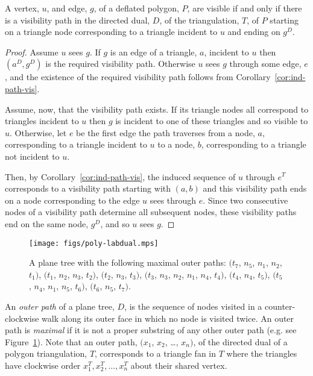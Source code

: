\documentclass[11pt]{amsart}
\begin{document}
\begin{theorem}
  \label{thm:dd-det-ve}
  A vertex, $u$, and edge, $g$, of a deflated polygon, $P$, are
  visible if and only if there is a visibility path in the directed
  dual, $D$, of the triangulation, $T$, of $P$ starting on a triangle
  node corresponding to a triangle incident to $u$ and ending on
  $g^D$.
\end{theorem}
\begin{proof}
  Assume $u$ sees $g$.  If $g$ is an edge of a triangle, $a$, incident
  to $u$ then $(a^D, g^D)$ is the required visibility path.  Otherwise
  $u$ sees $g$ through some edge, $e$, and the existence of the
  required visibility path follows from
  Corollary~\ref{cor:ind-path-vis}.
  
  Assume, now, that the visibility path exists.  If its triangle nodes
  all correspond to triangles incident to $u$ then $g$ is incident to
  one of these triangles and so visible to $u$.  Otherwise, let $e$ be
  the first edge the path traverses from a node, $a$, corresponding to
  a triangle incident to $u$ to a node, $b$, corresponding to a
  triangle not incident to $u$.
  
  Then, by Corollary~\ref{cor:ind-path-vis}, the induced sequence of
  $u$ through $e^T$ corresponds to a visibility path starting with
  $(a, b)$ and this visibility path ends on a node corresponding to
  the edge $u$ sees through $e$.  Since two consecutive nodes of a
  visibility path determine all subsequent nodes, these visibility
  paths end on the same node, $g^D$, and so $u$ sees $g$.
\end{proof}


\begin{figure}[htb]
  \centering \texttt{[image: figs/poly-labdual.mps]}
  \caption{A plane tree with the following maximal outer paths:
    $(t_7$, $n_5$, $n_1$, $n_2$, $t_1)$, $(t_1$, $n_2$, $n_3$, $t_2)$,
    $(t_2$, $n_3$, $t_3)$, $(t_3$, $n_3$, $n_2$, $n_1$, $n_4$, $t_4)$,
    $(t_4$, $n_4$, $t_5)$, $(t_5$, $n_4$, $n_1$, $n_5$, $t_6)$,
    $(t_6$, $n_5$, $t_7)$.}
  \label{fig:outer-path}
\end{figure}

An \emph{outer path} of a plane tree, $D$, is the sequence of nodes
visited in a counter-clockwise walk along its outer face in which no
node is visited twice.  An outer path is \emph{maximal} if it is not a
proper substring of any other outer path (e.g. see
Figure~\ref{fig:outer-path}).  Note that an outer path, $(x_1$, $x_2$,
\ldots, $x_n)$, of the directed dual of a polygon triangulation, $T$,
corresponds to a triangle fan in $T$ where the triangles have
clockwise order $x_1^T, x_2^T, \ldots, x_n^T$ about their shared
vertex.
\end{document}
